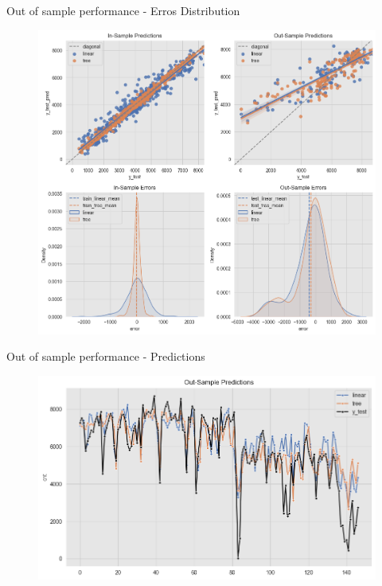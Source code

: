 \documentclass[10pt]{beamer}
\begin{document}
\begin{frame}{Out of sample performance - Erros Distribution}
\begin{center}
  \begin{figure}
    \includegraphics[scale=0.35]{images/interpretable_ml_44_0.png} 
  \end{figure}
\end{center}
\end{frame}

\begin{frame}{Out of sample performance - Predictions}
\begin{center}
  \begin{figure}
    \includegraphics[scale=0.45]{images/interpretable_ml_47_0.png} 
  \end{figure}
\end{center}
\end{frame}
\end{document}
